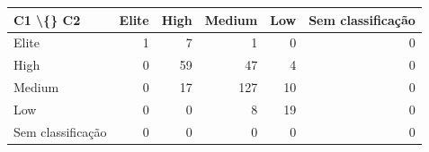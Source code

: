 \begin{tabular}{lrrrrr}
\hline
C1 \textbackslash\{\} C2 & Elite & High & Medium & Low & Sem classificação \\
\hline
Elite & 1 & 7 & 1 & 0 & 0 \\
High & 0 & 59 & 47 & 4 & 0 \\
Medium & 0 & 17 & 127 & 10 & 0 \\
Low & 0 & 0 & 8 & 19 & 0 \\
Sem classificação & 0 & 0 & 0 & 0 & 0 \\
\hline
\end{tabular}

